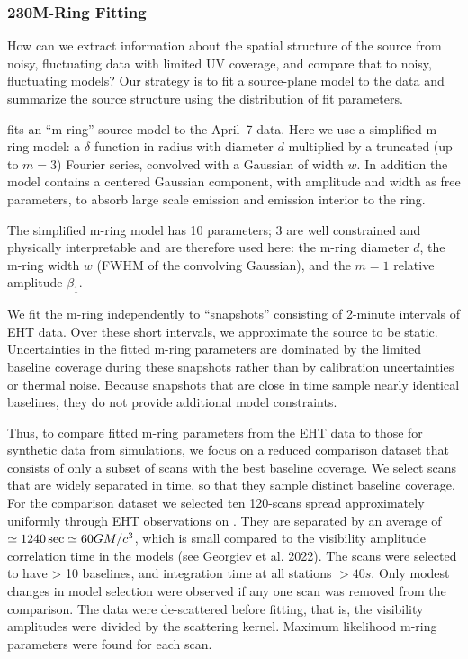 
\subsubsection{230\GHz M-Ring Fitting}

How can we extract information about the spatial structure of the source from noisy, fluctuating data with limited UV coverage, and compare that to noisy, fluctuating models?
Our strategy is to fit a source-plane model to the data and summarize the source structure using the distribution of fit parameters.

 fits an ``m-ring'' source model to the April~7 data.  Here we use a simplified m-ring model: a $\delta$ function in radius with diameter $d$ multiplied by a truncated (up to $m = 3$) Fourier series, convolved with a Gaussian of width $w$.  In addition the model contains a centered Gaussian component, with amplitude and width as free parameters, to absorb large scale emission and emission interior to the ring.

The simplified m-ring model has 10 parameters; 3 are well constrained and physically interpretable and are therefore used here: the m-ring diameter $d$, the m-ring width $w$ (FWHM of the convolving  Gaussian), and the $m=1$ relative amplitude $\beta_1$.

We fit the m-ring independently to ``snapshots'' consisting of 2-minute intervals of EHT data. Over these short intervals, we approximate the source to be static.  Uncertainties in the fitted m-ring parameters are dominated by the limited baseline coverage during these snapshots rather than by calibration uncertainties or thermal noise. Because snapshots that are close in time sample nearly identical baselines, they do not provide additional model constraints.

Thus, to compare fitted m-ring parameters from the EHT data to those for synthetic data from simulations, we focus on a reduced comparison dataset that consists of only a subset of scans with the best baseline coverage. We select scans that are widely separated in time, so that they sample distinct baseline coverage. For the comparison dataset we selected ten 120-\sec scans spread approximately uniformly through EHT observations on \aprilvii.  They are separated by an average of $\simeq 1240\,\mathrm{sec} \simeq 60 GM/c^3$, which is small compared to the visibility amplitude correlation time in the models (see Georgiev et al. 2022). The scans were selected to have > 10 baselines, and integration time at all stations $> 40s$.    Only modest changes in model selection were observed if any one scan was removed from the comparison.  The data were de-scattered before fitting, that is, the visibility amplitudes were divided by the scattering kernel.  Maximum likelihood m-ring parameters were found for each scan.

